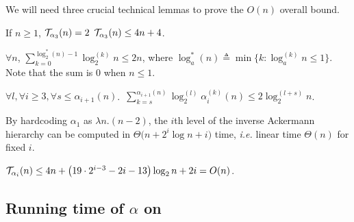 We will need three crucial technical lemmas to prove the $O(n)$ overall bound.
\begin{lem} \label{lem: inv-ack-3-runtime}
	If $n\ge 1$, $\mathcal{T}_{\alpha_3}(n) = 2$ $\mathcal{T}_{\alpha_3}(n) \le 4n + 4$.
\end{lem}
\begin{lem} \label{lem:critlem2}
	$\forall n$, $\displaystyle \sum_{k = 0}^{\log_2^*(n) - 1}\log_2^{(k)}n \le 2n$, where $\log_a^*(n) \triangleq \min\{k : \log_a^{(k)}n \le 1\}$. Note that the sum is $0$ when $n\le 1$.
\end{lem}
\begin{lem} \label{lem: sum-alpha-repeat}
	$\forall l, \forall i \ge 3, \forall s\le \alpha_{i+1}(n)$.~$\displaystyle \sum_{k=s}^{\alpha_{i+1}(n)} \log_2^{(l)}\alpha_i^{(k)}(n) \le 2\log_2^{(l+s)}n$.
\end{lem}
By hardcoding $\alpha_1$ as $\lambda n.(n-2)$, the $i$th level of the inverse Ackermann hierarchy can be computed in $\Theta\big(n + 2^i\log n  + i\big)$ time, \emph{i.e.} linear time $\Theta(n)$ for fixed $i$.
\begin{thm} \label{thm: inv-ack-hier-runtime-improved}
	$\mathcal{T}_{\alpha_i}(n) \le 4n + \left(19\cdot 2^{i-3} - 2i - 13\right)\log_2n + 2i = O(n)$.
\end{thm}

\subsection{Running time of $\alpha$ on } %

